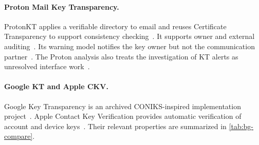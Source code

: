 \paragraph{Proton Mail Key Transparency.}
ProtonKT applies a verifiable directory to email and reuses Certificate Transparency to support
consistency checking~\cite{goebel2023proton}. It supports owner and external auditing~\cite{goebel2023proton}.
Its warning model notifies the key owner but not the communication
partner~\cite{goebel2023proton}. The Proton analysis also treats the investigation of KT alerts as
unresolved interface work~\cite{goebel2023proton}.

\paragraph{Google KT and Apple CKV.}
Google Key Transparency is an archived CONIKS-inspired implementation
project~\cite{google-kt}. Apple Contact Key Verification provides automatic verification of account
and device keys~\cite{apple-ckv}. Their relevant properties are summarized in
\cref{tab:bg-compare}.
